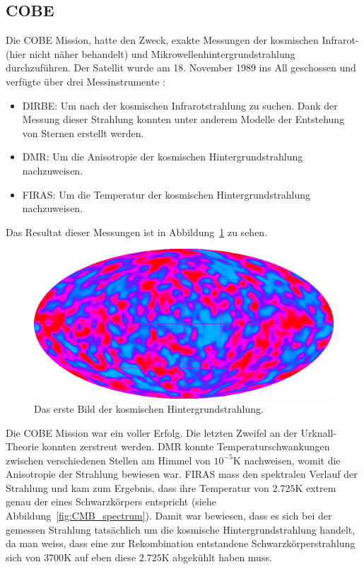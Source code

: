 \subsection{\ac{COBE}}
Die \ac{COBE} Mission, hatte den Zweck, exakte 
Messungen der kosmischen Infrarot-(hier nicht näher behandelt) und 
Mikrowellenhintergrundstrahlung durchzuführen.
Der Satellit wurde am 18. November 1989 ins All geschossen und verfügte über 
drei Messinstrumente \cite{cmb:COBE}:
\begin{itemize}
	\item \ac{DIRBE}: Um nach der 
	kosmischen Infrarotstrahlung zu suchen.
	Dank der Messung dieser Strahlung konnten unter anderem Modelle der 
	Entstehung von Sternen erstellt werden.
%
%
	\item \ac{DMR}: Um die Anisotropie der 
	kosmischen Hintergrundstrahlung nachzuweisen.
%
%
	\item \ac{FIRAS}: Um die Temperatur 
	der kosmischen Hintergrundstrahlung nachzuweisen. 
%
\end{itemize}

Das Resultat dieser Messungen ist in Abbildung~\ref{fig:COBE} zu sehen.
\begin{figure}
	\centering
	\includegraphics[width=\linewidth]{cmb/images/CMB_COBE.png}
	\caption{Das erste Bild der kosmischen Hintergrundstrahlung.}
	\label{fig:COBE}
\end{figure}
Die \ac{COBE} Mission war ein voller Erfolg.
Die letzten Zweifel an der Urknall-Theorie konnten zerstreut werden.
\ac{DMR} konnte Temperaturschwankungen zwischen verschiedenen Stellen am Himmel 
von $10^{-5} \text{K}$ nachweisen, womit die Anisotropie der Strahlung bewiesen 
war.
\ac{FIRAS} mass den spektralen Verlauf der Strahlung und kam zum Ergebnis, dass 
ihre Temperatur von $2.725 \text{K}$ extrem genau der eines Schwarzkörpers 
entspricht (siehe Abbildung~\ref{fig:CMB_spectrum}).
Damit war bewiesen, dass es sich bei der gemessen Strahlung tatsächlich um die 
kosmische Hintergrundstrahlung handelt, da man weiss, dass eine zur 
Rekombination entstandene Schwarzkörperstrahlung sich von $3700 \text{K}$ auf 
eben diese $2.725 \text{K}$ abgekühlt haben muss.

